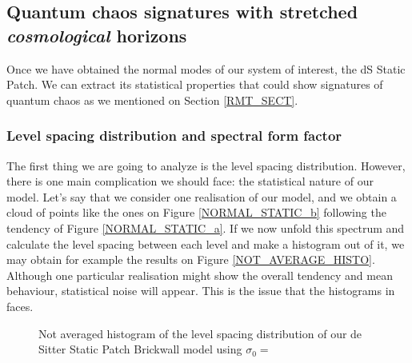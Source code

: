 \documentclass[11pt,a4paper]{article}
\begin{document}
{%

\subsection{Quantum chaos signatures with stretched \textit{cosmological} horizons}

Once we have obtained the normal modes of our system of interest, the dS Static Patch. We can extract its statistical properties that could show signatures of quantum chaos as we mentioned on Section \ref{RMT_SECT}.

\subsubsection{Level spacing distribution and spectral form factor}

The first thing we are going to analyze is the level spacing distribution. However, there is one main complication we should face: the statistical nature of our model. Let's say that we consider one realisation of our model, and we obtain a cloud of points like the ones on Figure \ref{NORMAL_STATIC_b} following the tendency of Figure \ref{NORMAL_STATIC_a}. If we now unfold this spectrum and calculate the level spacing between each level and make a histogram out of it, we may obtain for example the results on Figure \ref{NOT_AVERAGE_HISTO}. Although one particular realisation might show the overall tendency and mean behaviour, statistical noise will appear. This is the issue that the histograms in \cite{Jeong_2025,das2023fuzzballsrandommatrices,Das_2023} faces.

\begin{figure}[ht]
    \centering
        \caption{Not averaged histogram of the level spacing distribution of our de Sitter Static Patch Brickwall model using $\sigma_0=$}
\end{figure}

}
\end{document}
